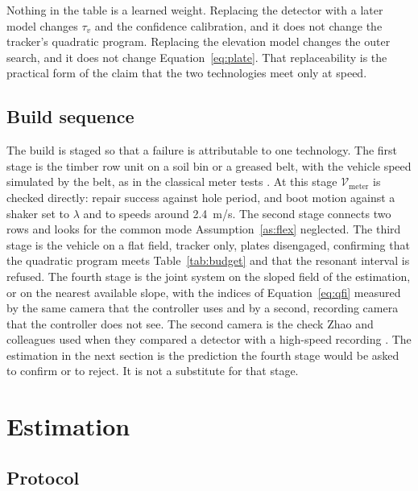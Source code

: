 Nothing in the table is a learned weight. Replacing the detector with a later model changes \(\tau_v\) and the confidence calibration, and it does not change the tracker's quadratic program. Replacing the elevation model changes the outer search, and it does not change Equation~\eqref{eq:plate}. That replaceability is the practical form of the claim that the two technologies meet only at speed.

\subsection{Build sequence}

The build is staged so that a failure is attributable to one technology. The first stage is the timber row unit on a soil bin or a greased belt, with the vehicle speed simulated by the belt, as in the classical meter tests \cite{iso7256,panning2000}. At this stage \(\mathcal{V}_{\mathrm{meter}}\) is checked directly: repair success against hole period, and boot motion against a shaker set to \(\lambda\) and to speeds around \SI{2.4}{m/s}. The second stage connects two rows and looks for the common mode Assumption~\ref{as:flex} neglected. The third stage is the vehicle on a flat field, tracker only, plates disengaged, confirming that the quadratic program meets Table~\ref{tab:budget} and that the resonant interval is refused. The fourth stage is the joint system on the sloped field of the estimation, or on the nearest available slope, with the indices of Equation~\eqref{eq:qfi} measured by the same camera that the controller uses and by a second, recording camera that the controller does not see. The second camera is the check Zhao and colleagues used when they compared a detector with a high-speed recording \cite{zhao2025yolo}. The estimation in the next section is the prediction the fourth stage would be asked to confirm or to reject. It is not a substitute for that stage.

\section{Estimation}
\label{sec:est}

\subsection{Protocol}

